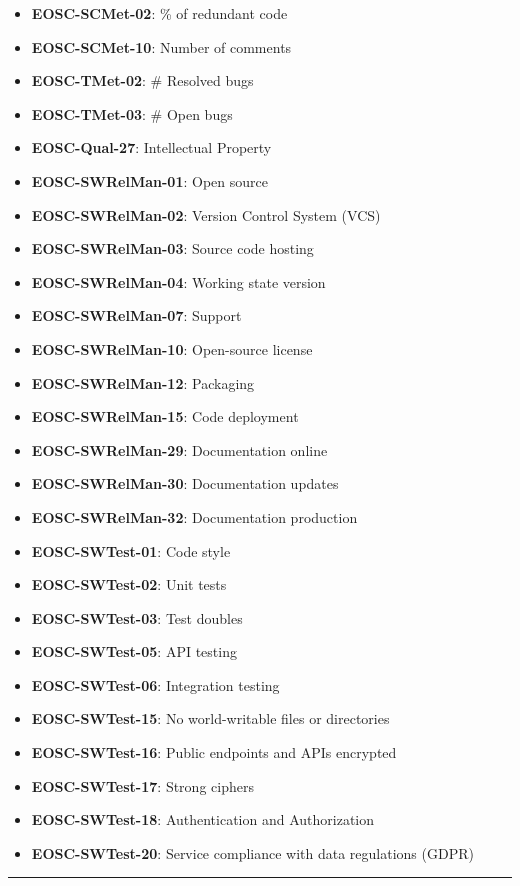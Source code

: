 \begin{itemize}
    \item \textbf{EOSC-SCMet-02}: \% of redundant code
    \item \textbf{EOSC-SCMet-10}: Number of comments
    \item \textbf{EOSC-TMet-02}: \# Resolved bugs
    \item \textbf{EOSC-TMet-03}: \# Open bugs
    \item \textbf{EOSC-Qual-27}: Intellectual Property
    \item \textbf{EOSC-SWRelMan-01}: Open source
    \item \textbf{EOSC-SWRelMan-02}: Version Control System (VCS)
    \item \textbf{EOSC-SWRelMan-03}: Source code hosting
    \item \textbf{EOSC-SWRelMan-04}: Working state version
    \item \textbf{EOSC-SWRelMan-07}: Support
    \item \textbf{EOSC-SWRelMan-10}: Open-source license
    \item \textbf{EOSC-SWRelMan-12}: Packaging
    \item \textbf{EOSC-SWRelMan-15}: Code deployment
    \item \textbf{EOSC-SWRelMan-29}: Documentation online
    \item \textbf{EOSC-SWRelMan-30}: Documentation updates
    \item \textbf{EOSC-SWRelMan-32}: Documentation production
    \item \textbf{EOSC-SWTest-01}: Code style
    \item \textbf{EOSC-SWTest-02}: Unit tests
    \item \textbf{EOSC-SWTest-03}: Test doubles
    \item \textbf{EOSC-SWTest-05}: API testing
    \item \textbf{EOSC-SWTest-06}: Integration testing
    \item \textbf{EOSC-SWTest-15}: No world-writable files or directories
    \item \textbf{EOSC-SWTest-16}: Public endpoints and APIs encrypted
    \item \textbf{EOSC-SWTest-17}: Strong ciphers
    \item \textbf{EOSC-SWTest-18}: Authentication and Authorization
    \item \textbf{EOSC-SWTest-20}: Service compliance with data regulations (GDPR)
\end{itemize}
\hrule

